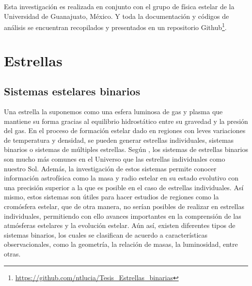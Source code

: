 \documentclass[12pt,oneside,openany,letter]{book}
\begin{document}
Esta investigación es realizada en conjunto con el grupo de física estelar de la Universidad de Guanajuato, México. Y toda la documentación y códigos de análisis se encuentran recopilados y presentados en un repositorio Github\footnote{\url{https://github.com/ntlucia/Tesis_Estrellas_binarias}}.

\chapter{Estrellas}\label{cap:estrellas}

\section{Sistemas estelares binarios}

Una estrella la suponemos como una esfera luminosa de gas y plasma que mantiene su forma gracias al equilibrio hidrostático entre su gravedad y la presión del gas. En el proceso de formación estelar dado en regiones con leves variaciones de temperatura y densidad, se pueden generar estrellas individuales, sistemas binarios o sistemas de múltiples estrellas. Según \citep{fisher2005local}, los sistemas de estrellas binarios son mucho más comunes en el Universo que las estrellas individuales como nuestro Sol. Además, la investigación de estos sistemas permite conocer información astrofísica como la masa y radio estelar en su estado evolutivo con una precisión superior a la que es posible en el caso de estrellas individuales. Así mismo, estos sistemas son útiles para hacer estudios de regiones como la cromósfera estelar, que de otra manera, no serían posibles de realizar en estrellas individuales, permitiendo con ello avances importantes en la comprensión de las atmósferas estelares y la evolución estelar. Aún así, existen diferentes tipos de sistemas binarios, los cuales se clasifican de acuerdo a características observacionales, como la geometría, la relación de masas, la luminosidad, entre otras.
\end{document}

